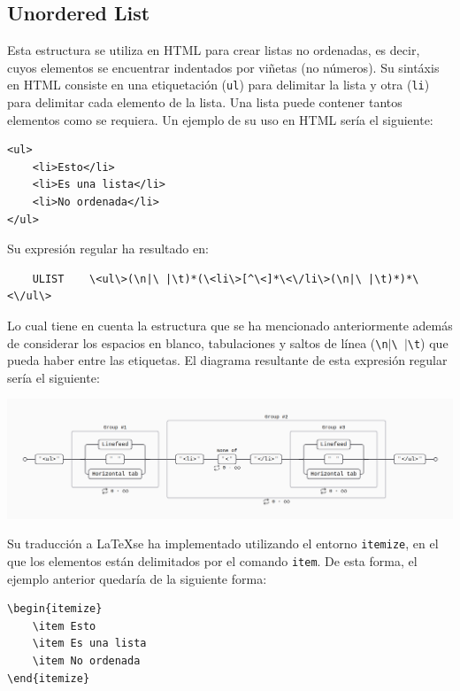 \documentclass[12pt]{article}
\begin{document}
\subsection{Unordered List}
Esta estructura se utiliza en HTML para crear listas no ordenadas, es decir, cuyos elementos se encuentrar indentados por viñetas (no números). Su sintáxis en HTML consiste en una etiquetación (\verb|ul|) para delimitar la lista y otra (\verb|li|) para delimitar cada elemento de la lista. Una lista puede contener tantos elementos como se requiera. Un ejemplo de su uso en HTML sería el siguiente:
\begin{verbatim}
<ul>
    <li>Esto</li>
    <li>Es una lista</li>
    <li>No ordenada</li>
</ul>
\end{verbatim}
Su expresión regular ha resultado en:
\begin{verbatim}
    ULIST    \<ul\>(\n|\ |\t)*(\<li\>[^\<]*\<\/li\>(\n|\ |\t)*)*\<\/ul\>
\end{verbatim}
Lo cual tiene en cuenta la estructura que se ha mencionado anteriormente además de considerar los espacios en blanco, tabulaciones y saltos de línea (\verb|\n|$|$\verb|\ |$|$\verb|\t|) que pueda haber entre las etiquetas. El diagrama resultante de esta expresión regular sería el siguiente:

\begin{center}\includegraphics[width=15cm]{./images/image4.png}\end{center}

Su traducción a \LaTeX se ha implementado utilizando el entorno \verb|itemize|, en el que los elementos están delimitados por el comando \verb|item|. De esta forma, el ejemplo anterior quedaría de la siguiente forma:
\begin{verbatim}
\begin{itemize}
    \item Esto
    \item Es una lista
    \item No ordenada
\end{itemize}
\end{verbatim}
\end{document}
